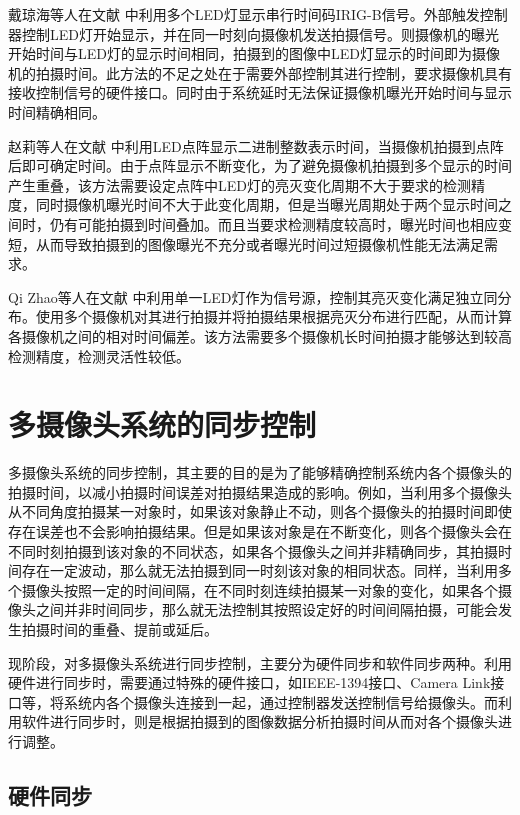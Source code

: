 戴琼海等人在文献 \cite{戴琼海111} 中利用多个LED灯显示串行时间码IRIG-B信号。外部触发控制器控制LED灯开始显示，并在同一时刻向摄像机发送拍摄信号。则摄像机的曝光开始时间与LED灯的显示时间相同，拍摄到的图像中LED灯显示的时间即为摄像机的拍摄时间。此方法的不足之处在于需要外部控制其进行控制，要求摄像机具有接收控制信号的硬件接口。同时由于系统延时无法保证摄像机曝光开始时间与显示时间精确相同。

赵莉等人在文献 \cite{赵莉1992高速摄影机数据记录系统研究} 中利用LED点阵显示二进制整数表示时间，当摄像机拍摄到点阵后即可确定时间。由于点阵显示不断变化，为了避免摄像机拍摄到多个显示的时间产生重叠，该方法需要设定点阵中LED灯的亮灭变化周期不大于要求的检测精度，同时摄像机曝光时间不大于此变化周期，但是当曝光周期处于两个显示时间之间时，仍有可能拍摄到时间叠加。而且当要求检测精度较高时，曝光时间也相应变短，从而导致拍摄到的图像曝光不充分或者曝光时间过短摄像机性能无法满足需求。

Qi Zhao等人在文献 \cite{zhao2009high} 中利用单一LED灯作为信号源，控制其亮灭变化满足独立同分布。使用多个摄像机对其进行拍摄并将拍摄结果根据亮灭分布进行匹配，从而计算各摄像机之间的相对时间偏差。该方法需要多个摄像机长时间拍摄才能够达到较高检测精度，检测灵活性较低。


\section{多摄像头系统的同步控制}

多摄像头系统的同步控制，其主要的目的是为了能够精确控制系统内各个摄像头的拍摄时间，以减小拍摄时间误差对拍摄结果造成的影响。例如，当利用多个摄像头从不同角度拍摄某一对象时，如果该对象静止不动，则各个摄像头的拍摄时间即使存在误差也不会影响拍摄结果。但是如果该对象是在不断变化，则各个摄像头会在不同时刻拍摄到该对象的不同状态，如果各个摄像头之间并非精确同步，其拍摄时间存在一定波动，那么就无法拍摄到同一时刻该对象的相同状态。同样，当利用多个摄像头按照一定的时间间隔，在不同时刻连续拍摄某一对象的变化，如果各个摄像头之间并非时间同步，那么就无法控制其按照设定好的时间间隔拍摄，可能会发生拍摄时间的重叠、提前或延后。

现阶段，对多摄像头系统进行同步控制，主要分为硬件同步和软件同步两种。利用硬件进行同步时，需要通过特殊的硬件接口，如IEEE-1394接口、Camera Link接口等，将系统内各个摄像头连接到一起，通过控制器发送控制信号给摄像头。而利用软件进行同步时，则是根据拍摄到的图像数据分析拍摄时间从而对各个摄像头进行调整。

\subsection{硬件同步}

